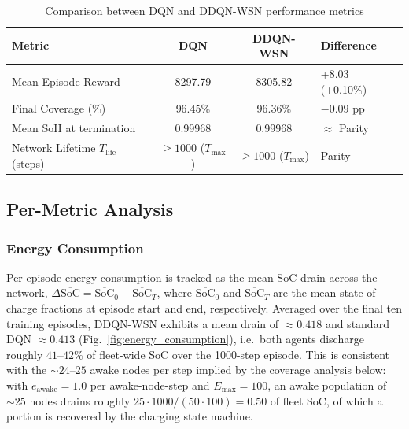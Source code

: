 \documentclass[journal]{IEEEtran}
\begin{document}
\begin{table}[h]
\centering
\small
\setlength{\tabcolsep}{4pt} %

\begin{tabularx}{\linewidth}{|X|c|c|X|}
\hline
\textbf{Metric} & \textbf{DQN} & \textbf{DDQN-WSN} & \textbf{Difference} \\
\hline

Mean Episode Reward & 8297.79 & 8305.82 & +8.03 (+0.10\%) \\
\hline

Final Coverage (\%) & 96.45\% & 96.36\% & $-0.09$ pp \\
\hline

Mean SoH at termination & 0.99968 & 0.99968 & $\approx$ Parity \\
\hline

Network Lifetime $T_{\text{life}}$ (steps) & $\geq 1000$ ($T_{\max}$) & $\geq 1000$ ($T_{\max}$) & Parity \\
\hline

\end{tabularx}

\caption{Comparison between DQN and DDQN-WSN performance metrics}
\label{tab:dqn_vs_ddqn_wsn}
\end{table}

\subsection{Per-Metric Analysis}

\subsubsection{Energy Consumption}

Per-episode energy consumption is tracked as the mean SoC drain across
the network, $\Delta\overline{\mathrm{SoC}} = \overline{\mathrm{SoC}}_0
- \overline{\mathrm{SoC}}_{T}$, where $\overline{\mathrm{SoC}}_0$ and
$\overline{\mathrm{SoC}}_{T}$ are the mean state-of-charge fractions
at episode start and end, respectively. Averaged over the final ten
training episodes, DDQN-WSN exhibits a mean drain of $\approx 0.418$
and standard DQN $\approx 0.413$ (Fig.~\ref{fig:energy_consumption}),
i.e.\ both agents discharge roughly $41$--$42\%$ of fleet-wide SoC
over the 1000-step episode. This is consistent with the
$\sim\!24$--$25$ awake nodes per step implied by the coverage analysis
below: with $e_{\text{awake}} = 1.0$ per awake-node-step and
$E_{\max} = 100$, an awake population of $\sim\!25$ nodes drains
roughly $25 \cdot 1000 / (50 \cdot 100) = 0.50$ of fleet SoC, of which
a portion is recovered by the charging state machine.
\end{document}
